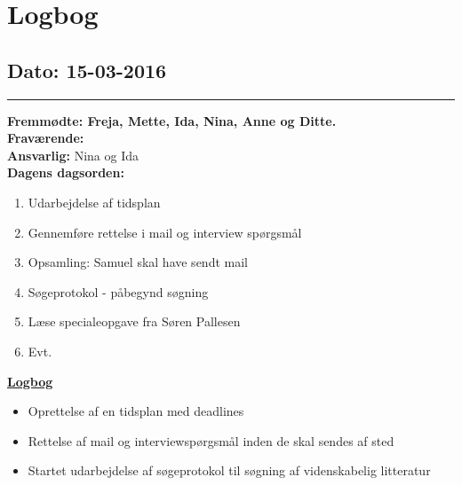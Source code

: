 \chapter{Logbog}
\section{Dato: 15-03-2016}
\hrule
\textbf{Fremmødte: Freja, Mette, Ida, Nina, Anne og Ditte.} \\
\textbf{Fraværende: } \\
\textbf{Ansvarlig:} Nina og Ida \\
\textbf{Dagens dagsorden: }
\begin{enumerate}
	\item Udarbejdelse af tidsplan
	\item Gennemføre rettelse i mail og interview spørgsmål
	\item Opsamling: Samuel skal have sendt mail
	\item Søgeprotokol - påbegynd søgning
	\item Læse specialeopgave fra Søren Pallesen
	\item Evt. 
\end{enumerate}

\underline{\textbf{Logbog}}
\begin{itemize}
\item Oprettelse af en tidsplan med deadlines
\item Rettelse af mail og interviewspørgsmål inden de skal sendes af sted
\item Startet udarbejdelse af søgeprotokol til søgning af videnskabelig litteratur
\end{itemize}